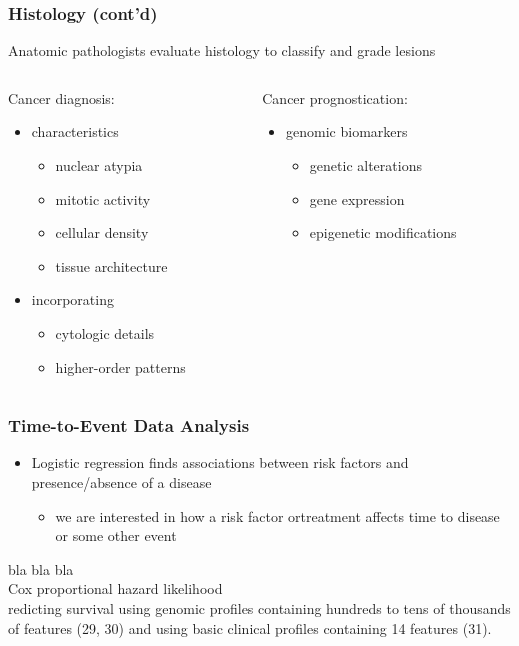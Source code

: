 \message{ !name(presentation.tex)}\documentclass[usenames,dvipsnames]{beamer}
\begin{document}
\begin{frame}
  \frametitle{Histology (cont'd)}
  Anatomic pathologists evaluate histology to classify and grade lesions
  \vspace{0.5cm}
  \begin{columns}[t]
    \begin{column}{.48\textwidth}
      Cancer diagnosis:
      \begin{itemize}
        \item characteristics
          \begin{itemize}
            \item nuclear atypia
            \item mitotic activity
            \item cellular density
            \item tissue architecture
          \end{itemize}
        \item incorporating
          \begin{itemize}
            \item cytologic details
            \item higher-order patterns
          \end{itemize}
      \end{itemize}
    \end{column}
    \begin{column}{.48\textwidth}
      Cancer prognostication:
      \begin{itemize}
        \item genomic biomarkers
          \begin{itemize}
            \item genetic alterations
            \item gene expression
            \item epigenetic modifications
          \end{itemize}
      \end{itemize}
    \end{column}
  \end{columns}
\end{frame}
\begin{frame}
  \frametitle{Time-to-Event Data Analysis}
  \begin{itemize}
    \item Logistic regression finds associations between risk factors and
    presence/absence of a disease
    \begin{itemize}
      \item we are interested in how a risk factor ortreatment affects time to disease or some other event
    \end{itemize}
  \end{itemize}
  bla bla bla\\

  Cox proportional hazard likelihood \\

  redicting survival using genomic profiles containing hundreds to tens of
  thousands of features (29, 30) and using basic clinical profiles containing 14
  features (31).

\end{frame}
\end{document}
